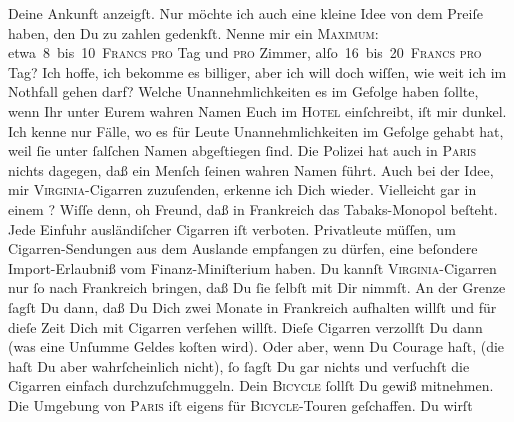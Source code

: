 \begin{ledgroupsized}[t]{13cm}
               Deine Ankunft anzeigſt. Nur möchte ich auch eine kleine Idee von dem Preiſe haben,
               den Du zu zahlen gedenkſt. \strikeout{\textcolor{gray}{Nenne}} Nenne mir ein \textsc{Maximum}: etwa 8 bis 10 \textsc{Francs}{ }\textsc{pro} Tag und \textsc{pro} Zimmer,
                  alſo 16 bis 20 \textsc{Francs}{ }\textsc{pro} Tag? Ich hoffe, ich bekomme es billiger, aber ich will
               doch wiſſen, wie weit ich im Nothfall gehen darf?\pend
           \pstart
           Welche Unannehmlichkeiten es im Gefolge haben ſollte, wenn Ihr unter Eurem wahren
               Namen Euch im \textsc{Hotel} einſchreibt, iſt mir dunkel. Ich kenne
               nur Fälle, wo es für Leute {\pb} Unannehmlichkeiten im Gefolge gehabt hat, weil ſie unter ſalſchen Namen
               abgeſtiegen ſind. Die Polizei hat auch in \textsc{Paris} nichts dagegen, daß ein Menſch ſeinen wahren Namen führt.\pend
           \pstart
           Auch bei der Idee, mir \textsc{Virginia}-Cigarren zuzuſenden,
               erkenne ich Dich wieder. Vielleicht gar in einem \label{K_L02806-2v}\label{K_L02806-2h}? Wiſſe denn, oh Freund, daß in Frankreich
               das Tabaks-Monopol beſteht. Jede Einfuhr 
               ausländiſcher Cigarren iſt verboten. Privatleute müſſen, um Cigarren-Sendungen  aus dem {\pb}Auslande
               empfangen zu dürfen, eine beſondere Import-Erlaubniß vom Finanz-Miniſterium haben. Du kannſt \textsc{Virginia}-Cigarren nur ſo nach Frankreich
               bringen, daß Du ſie ſelbſt mit Dir nimmſt. An der Grenze ſagſt Du dann, daß Du Dich
               zwei Monate in Frankreich aufhalten willſt und
               für dieſe Zeit Dich mit Cigarren verſehen willſt. Dieſe Cigarren verzollſt Du dann
               (was eine Unſumme  Geldes koſten wird). Oder aber,
               wenn Du Courage haſt, (die haſt Du aber wahrſcheinlich nicht), {\pb}ſo ſagſt Du gar nichts und verſuchſt die Cigarren
               einfach durchzuſchmuggeln.\pend
           \pstart
           Dein \textsc{Bicycle} ſollſt Du gewiß mitnehmen. Die Umgebung von
                  \textsc{Paris} iſt eigens für \textsc{Bicycle}-Touren geſchaffen. Du wirſt

\end{ledgroupsized}
